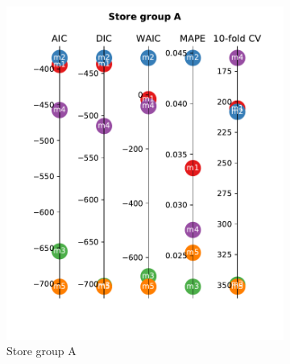\documentclass[english, 12pt, a4paper, sci, utf8, a-1b, online]{aaltothesis}
\begin{document}
\begin{figure}
	\begin{subfigure}[htb]{0.5\textwidth}
		\centering
		\includegraphics[width=\textwidth]{../plots/metrics/metrics_plot_A.pdf}
		\caption{Store group A}
		\label{fig:metrics_A}
	\end{subfigure}
	\hfill
	\begin{subfigure}[htb]{0.5\textwidth}
		\centering

\end{subfigure}
\end{figure}
\end{document}
